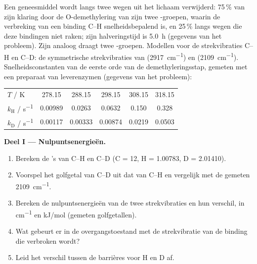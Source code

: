 \begin{problem}
\label{pb:b3:rate-theories:1}
Een geneesmiddel wordt langs twee wegen uit het lichaam verwijderd: 75\,\%
van zijn klaring door de O-demethylering van zijn twee -groepen,
waarin de verbreking van een binding C--H snelheidsbepalend is, en 25\,\%
langs wegen die deze bindingen niet raken; zijn halveringstijd is
\qty{5.0}{h} (gegevens van het probleem). Zijn analoog draagt twee
-groepen. Modellen voor de strekvibraties C--H en C--D: de
symmetrische strekvibraties van 
(\qty{2917}{cm^{-1}}) en  (\qty{2109}{cm^{-1}}). Snelheidsconstanten
van de eerste orde van de demethyleringsstap, gemeten met een preparaat
van leverenzymen (gegevens van het probleem):
\begin{center}\small
\begin{tabular}{lccccc}
\hline
$T$ / K & 278.15 & 288.15 & 298.15 & 308.15 & 318.15 \\
$k_{\mathrm H}$ / \unit{s^{-1}} & 0.00989 & 0.0263 & 0.0632 & 0.150 & 0.328 \\
$k_{\mathrm D}$ / \unit{s^{-1}} & 0.00117 & 0.00333 & 0.00874 & 0.0219 & 0.0503 \\ \hline
\end{tabular}
\end{center}

\medskip\noindent\textbf{Deel I --- Nulpuntsenergieën.}
\begin{enumerate}
  \item Bereken de 's van C--H en C--D (C = 12, H = 1.00783,
        D = 2.01410).
  \item Voorspel het golfgetal van C--D uit dat van C--H en vergelijk met de
        gemeten \qty{2109}{cm^{-1}}.
  \item Bereken de nulpuntsenergieën van de twee strekvibraties en hun
        verschil, in \unit{cm^{-1}} en \unit{kJ/mol} (gemeten golfgetallen).
  \item Wat gebeurt er in de overgangstoestand met de strekvibratie van de
        binding die verbroken wordt?
  \item Leid het verschil tussen de barrières voor H en D af.
\end{enumerate}


\end{problem}
